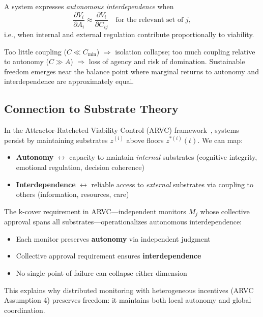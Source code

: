 \documentclass[11pt,a4paper]{article}
\begin{document}
A system expresses \emph{autonomous interdependence} when
\begin{equation}
  \frac{\partial V_i}{\partial A_i} \approx \frac{\partial V_i}{\partial C_{ij}} \quad \text{for the relevant set of } j,
  \label{eq:balance}
\end{equation}
i.e., when internal and external regulation contribute proportionally to viability. 

Too little coupling ($C \ll C_{\min}$) $\Rightarrow$ isolation collapse; too much coupling relative to autonomy ($C \gg A$) $\Rightarrow$ loss of agency and risk of domination. Sustainable freedom emerges near the balance point where marginal returns to autonomy and interdependence are approximately equal.

\subsection{Connection to Substrate Theory}

In the Attractor-Ratcheted Viability Control (ARVC) framework~\cite{arvc}, systems persist by maintaining substrates $z^{(i)}$ above floors $z^{*(i)}(t)$. We can map:

\begin{itemize}
    \item \textbf{Autonomy} $\leftrightarrow$ capacity to maintain \emph{internal} substrates (cognitive integrity, emotional regulation, decision coherence)
    \item \textbf{Interdependence} $\leftrightarrow$ reliable access to \emph{external} substrates via coupling to others (information, resources, care)
\end{itemize}

The k-cover requirement in ARVC---independent monitors $M_j$ whose collective approval spans all substrates---operationalizes autonomous interdependence:
\begin{itemize}
    \item Each monitor preserves \textbf{autonomy} via independent judgment
    \item Collective approval requirement ensures \textbf{interdependence}
    \item No single point of failure can collapse either dimension
\end{itemize}

This explains why distributed monitoring with heterogeneous incentives (ARVC Assumption 4) preserves freedom: it maintains both local autonomy and global coordination.
\end{document}
